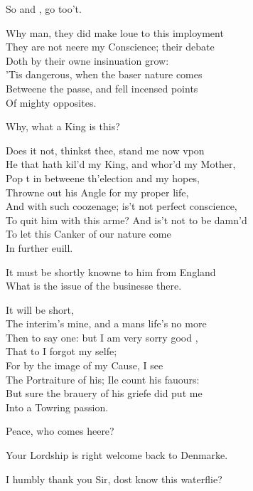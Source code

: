 \documentclass[a5paper,DIV=calc,11pt]{scrbook}
\begin{document}
\begin{drama*}
    \horspeaks So \guil and \rosin, go too't.
    
    \hamspeaks Why man, they did make loue to this imployment\\
    They are not neere my Conscience; their debate\\
    Doth by their owne insinuation grow:\\
    'Tis dangerous, when the baser nature comes\\
    Betweene the passe, and fell incensed points\\
    Of mighty opposites.
    
    \horspeaks Why, what a King is this?
    
    \hamspeaks Does it not, thinkst thee, stand me now vpon\\
    He that hath kil'd my King, and whor'd my Mother,\\
    Pop t in betweene th'election and my hopes,\\
    Throwne out his Angle for my proper life,\\
    And with such coozenage; is't not perfect conscience,\\
    To quit him with this arme? And is't not to be damn'd\\
    To let this Canker of our nature come\\
    In further euill.
    
    \horspeaks It must be shortly knowne to him from England\\
    What is the issue of the businesse there.
    
    \hamspeaks It will be short,\\
    The interim's mine, and a mans life's no more\\
    Then to say one: but I am very sorry good \hor,\\
    That to \laer I forgot my selfe;\\
    For by the image of my Cause, I see\\
    The Portraiture of his; Ile count his fauours:\\
    But sure the brauery of his griefe did put me\\
    Into a Towring passion.
    
    \horspeaks Peace, who comes heere?
    
    
    \osrspeaks Your Lordship is right welcome back to Denmarke.
    
    \hamspeaks I humbly thank you Sir, dost know this waterflie?
    

\end{drama*}
\end{document}
